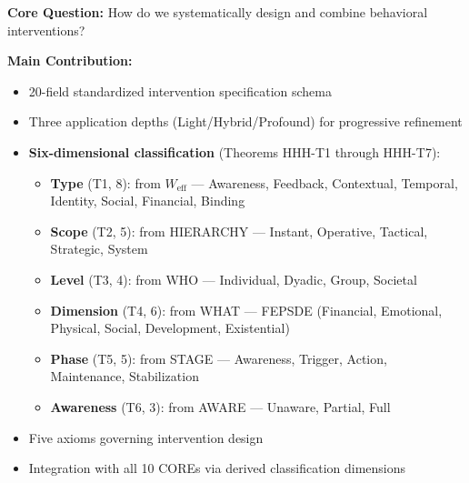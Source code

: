 \begin{tcolorbox}[colback=green!10!white, colframe=green!75!black,
    title=\textbf{Appendix TKT: Summary}]

\textbf{Core Question:} How do we systematically design and combine behavioral interventions?

\textbf{Main Contribution:}
\begin{itemize}[nosep]
    \item 20-field standardized intervention specification schema
    \item Three application depths (Light/Hybrid/Profound) for progressive refinement
    \item \textbf{Six-dimensional classification} (Theorems HHH-T1 through HHH-T7):
    \begin{itemize}[nosep]
        \item \textbf{Type} (T1, 8): from $W_{\text{eff}}$ --- Awareness, Feedback, Contextual, Temporal, Identity, Social, Financial, Binding
        \item \textbf{Scope} (T2, 5): from HIERARCHY --- Instant, Operative, Tactical, Strategic, System
        \item \textbf{Level} (T3, 4): from WHO --- Individual, Dyadic, Group, Societal
        \item \textbf{Dimension} (T4, 6): from WHAT --- FEPSDE (Financial, Emotional, Physical, Social, Development, Existential)
        \item \textbf{Phase} (T5, 5): from STAGE --- Awareness, Trigger, Action, Maintenance, Stabilization
        \item \textbf{Awareness} (T6, 3): from AWARE --- Unaware, Partial, Full
    \end{itemize}
    \item Five axioms governing intervention design
    \item Integration with all 10 COREs via derived classification dimensions
\end{itemize}


\end{tcolorbox}
